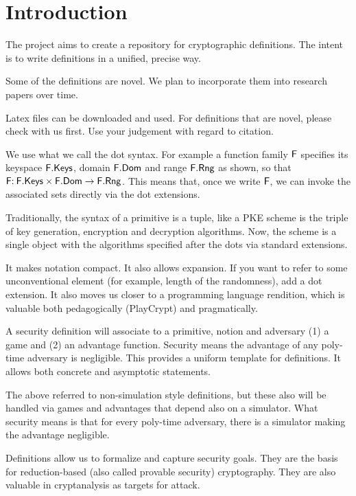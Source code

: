 
\section{Introduction}\label{sec-intro}

The project aims to create a repository for cryptographic definitions. The intent is to write definitions in a unified, precise way. 

Some of the definitions are novel. We plan to incorporate them into research papers over time. 

Latex files can be downloaded and used. For definitions that are novel, please check with us first. Use your judgement with regard to citation.

 We use what we call the dot syntax. For example a function family $\mathsf{F}$ specifies its keyspace $\mathsf{F}.\mathsf{Keys}$, domain $\mathsf{F}.\mathsf{Dom}$ and range $\mathsf{F}.\mathsf{Rng}$ as shown, so that $\mathsf{F} {:\:} \mathsf{F}.\mathsf{Keys} \times \mathsf{F}.\mathsf{Dom}\to \mathsf{F}.\mathsf{Rng}$. This means that, once we write $\mathsf{F}$, we can invoke the associated sets directly via the dot extensions. 

Traditionally, the syntax of a primitive is a tuple, like a PKE scheme is the triple of key generation, encryption and decryption algorithms. Now, the scheme is a single object with the algorithms specified after the dots via standard extensions. 

It makes notation compact. It also allows expansion. If you want to refer to some unconventional element (for example, length of the randomness), add a dot extension. It also moves us closer to a programming language rendition, which is valuable both pedagogically (PlayCrypt) and pragmatically.

 A security definition will associate to a primitive, notion and adversary (1) a game and (2) an advantage function. Security means the advantage of any poly-time adversary is negligible. This provides a uniform template for definitions. It allows both concrete and asymptotic statements. 

The above referred to non-simulation style definitions, but these also will be handled via games and advantages that depend also on a simulator. What security means is that for every poly-time adversary, there is a simulator making the advantage negligible.


 Definitions allow us to formalize and capture security goals. They are the basis for reduction-based (also called provable security) cryptography. They are also valuable in cryptanalysis as targets for attack. 


